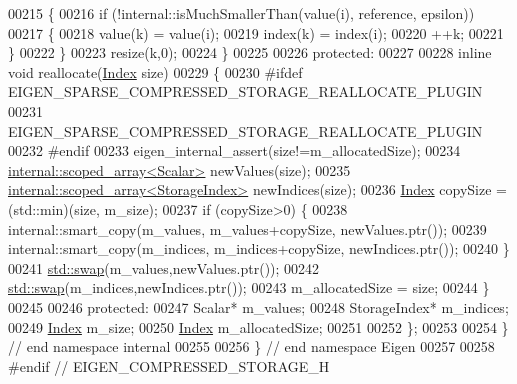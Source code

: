 \begin{DoxyCode}
00215       \{
00216         \textcolor{keywordflow}{if} (!internal::isMuchSmallerThan(value(i), reference, epsilon))
00217         \{
00218           value(k) = value(i);
00219           index(k) = index(i);
00220           ++k;
00221         \}
00222       \}
00223       resize(k,0);
00224     \}
00225 
00226   \textcolor{keyword}{protected}:
00227 
00228     \textcolor{keyword}{inline} \textcolor{keywordtype}{void} reallocate(\hyperlink{namespace_eigen_a62e77e0933482dafde8fe197d9a2cfde}{Index} size)
00229     \{
00230 \textcolor{preprocessor}{      #ifdef EIGEN\_SPARSE\_COMPRESSED\_STORAGE\_REALLOCATE\_PLUGIN}
00231         EIGEN\_SPARSE\_COMPRESSED\_STORAGE\_REALLOCATE\_PLUGIN
00232 \textcolor{preprocessor}{      #endif}
00233       eigen\_internal\_assert(size!=m\_allocatedSize);
00234       \hyperlink{class_eigen_1_1internal_1_1scoped__array}{internal::scoped\_array<Scalar>} newValues(size);
00235       \hyperlink{class_eigen_1_1internal_1_1scoped__array}{internal::scoped\_array<StorageIndex>} newIndices(size);
00236       \hyperlink{namespace_eigen_a62e77e0933482dafde8fe197d9a2cfde}{Index} copySize = (std::min)(size, m\_size);
00237       \textcolor{keywordflow}{if} (copySize>0) \{
00238         internal::smart\_copy(m\_values, m\_values+copySize, newValues.ptr());
00239         internal::smart\_copy(m\_indices, m\_indices+copySize, newIndices.ptr());
00240       \}
00241       \hyperlink{endian_8c_a3ca5ecd34b04d6a243c054ac3a57f68d}{std::swap}(m\_values,newValues.ptr());
00242       \hyperlink{endian_8c_a3ca5ecd34b04d6a243c054ac3a57f68d}{std::swap}(m\_indices,newIndices.ptr());
00243       m\_allocatedSize = size;
00244     \}
00245 
00246   \textcolor{keyword}{protected}:
00247     Scalar* m\_values;
00248     StorageIndex* m\_indices;
00249     \hyperlink{namespace_eigen_a62e77e0933482dafde8fe197d9a2cfde}{Index} m\_size;
00250     \hyperlink{namespace_eigen_a62e77e0933482dafde8fe197d9a2cfde}{Index} m\_allocatedSize;
00251 
00252 \};
00253 
00254 \} \textcolor{comment}{// end namespace internal}
00255 
00256 \} \textcolor{comment}{// end namespace Eigen}
00257 
00258 \textcolor{preprocessor}{#endif // EIGEN\_COMPRESSED\_STORAGE\_H}
\end{DoxyCode}
